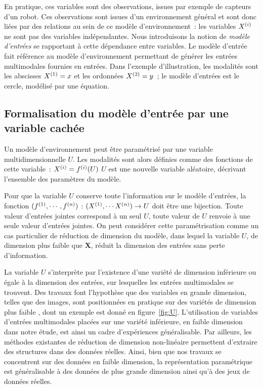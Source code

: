 \documentclass[../main]{subfiles}
\begin{document}
En pratique, ces variables sont des observations, issues par exemple de capteurs d'un robot. Ces observations sont issues d'un environnement général et sont donc liées par des relations au sein de ce modèle d'environnement~: les variables $X^{({i})}$ ne sont pas des variables indépendantes.
Nous introduisons la notion de \emph{modèle d'entrées} se rapportant à cette dépendance entre variables.
Le modèle d'entrée fait référence au modèle d'environnement permettant de générer les entrées multimodales fournies en entrées. Dans l'exemple d'illustration, les modalités sont les abscisses $X^{({1})} = x$ et les ordonnées $X^{({2})} = y$~; le modèle d'entrées est le cercle, modélisé par une équation.

\subsection{Formalisation du modèle d'entrée par une variable cachée}

Un modèle d'environnement peut être paramétrisé par une variable multidimensionnelle $U$. 
Les modalités sont alors définies comme des fonctions de cette variable~:
$X^{({i})} = f^{({i})}(U)$
$U$ est une nouvelle variable aléatoire, décrivant l'ensemble des paramètres du modèle.

Pour que la variable $U$ conserve toute l'information sur le modèle d'entrées, la fonction $(f^{({1})}, \cdots, f^{({n})})$ : $(X^{({1})}, \cdots X^{({n})})\rightarrow U$ doit être une bijection. Toute valeur d'entrées jointes correspond à un seul $U$, toute valeur de $U$ renvoie à une seule valeur d'entrées jointes. 
On peut considérer cette paramétrisation comme un cas particulier de réduction de dimension du modèle, dans lequel la variable $U$, de dimension plus faible que $\mathbf{X}$, réduit la dimension des entrées sans perte d'information.

La variable $U$ s'interprète par l'existence d'une variété de dimension inférieure ou égale à la dimension des entrées, sur lesquelles les entrées multimodales se trouvent.
Des travaux font l'hypothèse que des variables en grande dimension, telles que des images, sont positionnées en pratique sur des variétés de dimension plus faible \cite{Pless2009ASO}, dont un exemple est donné en figure~\ref{fig:U}.
L'utilisation de variables d'entrées multimodales placées sur une variété inférieure, en faible dimension dans notre étude, est ainsi un cadre d'expériences généralisable.
Par ailleurs, les méthodes existantes de réduction de dimension non-linéaire permettent d'extraire des structures dans des données réelles. 
Ainsi, bien que nos travaux se concentrent sur des données en faible dimension, la représentation paramétrique est généralisable à des données de plus grande dimension ainsi qu'à des jeux de données réelles.
\end{document}
